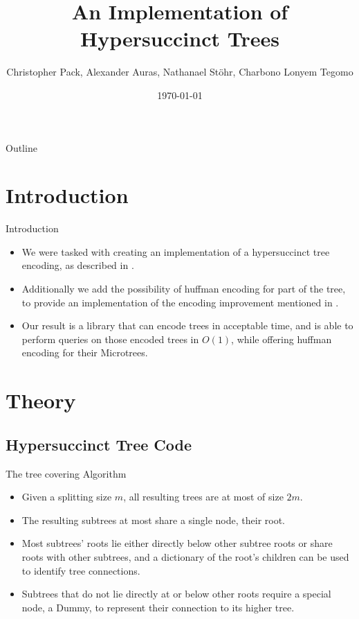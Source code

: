 \documentclass{beamer}
\title[An Implementation of Hypersuccinct Trees]
{An Implementation of Hypersuccinct Trees}
\author{Christopher Pack, Alexander Auras, Nathanael Stöhr, Charbono Lonyem Tegomo}
\institute[Universität Siegen]
{
  Lehrstuhl für theoretische Informatik\\
  Universität Siegen}
\date{\today}
\begin{document}
\begin{frame}
  \titlepage
\end{frame}

\begin{frame}{Outline}
  \tableofcontents
\end{frame}

\section[Introduction]{Introduction}

\begin{frame}{Introduction}
	\begin{itemize}
	\item
	We were tasked with creating an implementation of a hypersuccinct tree encoding, as described in \cite{farzanMunro}.
	\item
	Additionally we add the possibility of huffman encoding for part of the tree, to provide an implementation of the encoding improvement mentioned in \cite{universalSuccinct}.
	\item
	Our result is a library that can encode trees in acceptable time, and is able to perform queries on those encoded trees in $O(1)$, while offering huffman encoding for their Microtrees.
	\end{itemize}
\end{frame}

\section{Theory}

\subsection[Hypersuccinct Tree Code]{Hypersuccinct Tree Code}

\begin{frame}{The tree covering Algorithm} %
\begin{itemize}
	\item
		Given a splitting size $m$, all resulting trees are at most of size $2m$.
	\item
		The resulting subtrees at most share a single node, their root.
	\item
		Most subtrees' roots lie either directly below other subtree roots or share roots with other subtrees, and a dictionary of the root's children can be used to identify tree connections.
	\item
		Subtrees that do not lie directly at or below other roots require a special node, a Dummy, to represent their connection to its higher tree.
	\end{itemize}
\end{frame}
\end{document}

